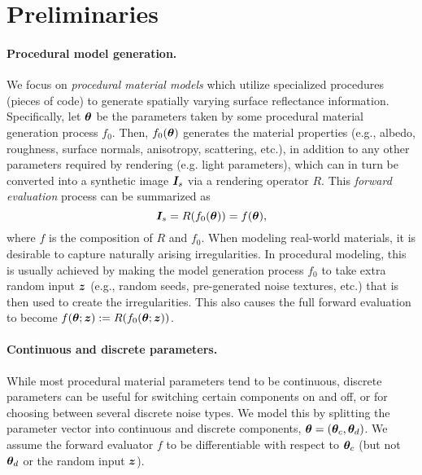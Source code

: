 \section{Preliminaries}
\label{sec:bayesian:prelim}

\paragraph{Procedural model generation.}
We focus on \emph{procedural material models} which utilize specialized procedures (pieces of code) to generate spatially varying surface reflectance information.
Specifically, let $\bm{\theta}$ be the parameters taken by some procedural material generation process $f_0$.
Then, $f_0(\bm{\theta})$ generates the material properties (e.g., albedo, roughness, surface normals, anisotropy, scattering, etc.), in addition to any other parameters required by rendering (e.g. light parameters), which can in turn be converted into a synthetic image $\bm{I}_s$ via a rendering operator $R$.
This \emph{forward evaluation} process can be summarized as
\begin{equation}
	\label{eq:forward}
	\bm{I}_s = R(f_0(\bm{\theta})) = f(\bm{\theta}),
\end{equation}
where $f$ is the composition of $R$ and $f_0$.
When modeling real-world materials, it is desirable to capture naturally arising irregularities.
In procedural modeling, this is usually achieved by making the model generation process $f_0$ to take extra random input $\bm{z}$ (e.g., random seeds, pre-generated noise textures, etc.) that is then used to create the irregularities.
This also causes the full forward evaluation to become $f(\bm{\theta}; \bm{z}) := R(f_0(\bm{\theta}; \bm{z}))$.

\paragraph{Continuous and discrete parameters.}
While most procedural material parameters tend to be continuous, discrete parameters can be useful for switching certain components on and off, or for choosing between several discrete noise types. We model this by splitting the parameter vector into continuous and discrete components, $\bm{\theta} = (\bm{\theta}_c, \bm{\theta}_d)$.
We assume the forward evaluator $f$ to be differentiable with respect to $\bm{\theta}_c$ (but not $\bm{\theta}_d$ or the random input $\bm{z}$).

